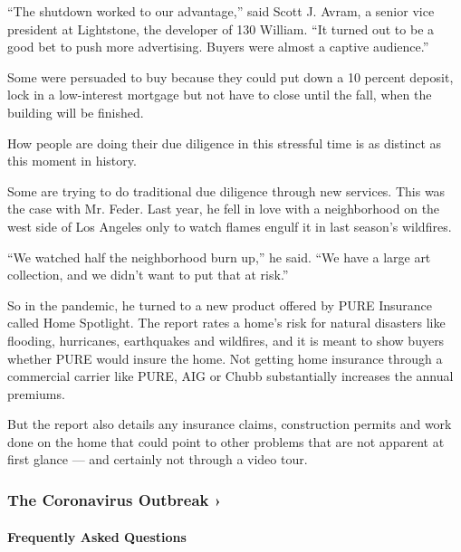 ``The shutdown worked to our advantage,'' said Scott J. Avram, a senior
vice president at Lightstone, the developer of 130 William. ``It turned
out to be a good bet to push more advertising. Buyers were almost a
captive audience.''

Some were persuaded to buy because they could put down a 10 percent
deposit, lock in a low-interest mortgage but not have to close until the
fall, when the building will be finished.

How people are doing their due diligence in this stressful time is as
distinct as this moment in history.

Some are trying to do traditional due diligence through new services.
This was the case with Mr. Feder. Last year, he fell in love with a
neighborhood on the west side of Los Angeles only to watch flames engulf
it in last season's wildfires.

``We watched half the neighborhood burn up,'' he said. ``We have a large
art collection, and we didn't want to put that at risk.''

So in the pandemic, he turned to a new product offered by PURE Insurance
called Home Spotlight. The report rates a home's risk for natural
disasters like flooding, hurricanes, earthquakes and wildfires, and it
is meant to show buyers whether PURE would insure the home. Not getting
home insurance through a commercial carrier like PURE, AIG or Chubb
substantially increases the annual premiums.

But the report also details any insurance claims, construction permits
and work done on the home that could point to other problems that are
not apparent at first glance --- and certainly not through a video tour.

\href{https://www.nytimes3xbfgragh.onion/news-event/coronavirus?action=click\&pgtype=Article\&state=default\&region=MAIN_CONTENT_3\&context=storylines_faq}{}

\hypertarget{the-coronavirus-outbreak-}{%
\subsubsection{The Coronavirus Outbreak
›}\label{the-coronavirus-outbreak-}}

\hypertarget{frequently-asked-questions}{%
\paragraph{Frequently Asked
Questions}\label{frequently-asked-questions}}

